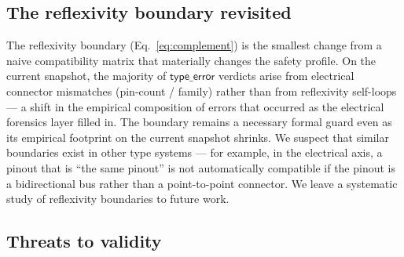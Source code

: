 \documentclass[review]{elsarticle}
\begin{document}
\subsection{The reflexivity boundary revisited}

The reflexivity boundary (Eq.~\eqref{eq:complement}) is the smallest
change from a naive compatibility matrix that materially changes the
safety profile. On the current snapshot, the majority of
$\mathsf{type\_error}$ verdicts arise from electrical connector
mismatches (pin-count / family) rather than from reflexivity
self-loops --- a shift in the empirical composition of errors that
occurred as the electrical forensics layer filled in. The boundary
remains a necessary formal guard even as its empirical footprint
on the current snapshot shrinks. We suspect that similar boundaries
exist in other type systems --- for example, in the electrical axis,
a pinout that is ``the same pinout'' is not automatically compatible
if the pinout is a bidirectional bus rather than a point-to-point
connector. We leave a systematic study of reflexivity boundaries
to future work.

\subsection{Threats to validity}
\end{document}
